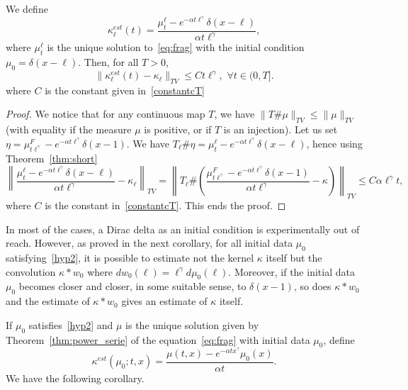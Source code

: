 \documentclass[10pt]{amsart}
\theoremstyle{definition}\newtheorem{defi}[theo]{Definition}\newtheorem{rema}[theo]{Remark}\newtheorem{exam}[theo]{Example}\newtheorem{exem}[theo]{Example}\newtheorem{nota}[theo]{Notation}
\renewcommand*\a{\alpha}
\let\oldforall\forall
\renewcommand*{\forall}{\mathrel{\oldforall}}
\begin{document}
\begin{coro}[An estimate for $\kappa$ using short-time measurements of the particles size distribution when initial condition is a delta function at $x=\ell$]\label{cor:rescaling}
We define
\begin{equation*}
\kappa_{\ell}^{est}(t)= \dfrac{\mu_t^{\ell} - e^{-\a t\ell^{\gamma}} \delta(x-\ell) }{\a t \ell^{\gamma}},
\end{equation*}
where $\mu_t^{\ell}$ is the unique solution to~\eqref{eq:frag} with the initial condition $\mu_0 = \delta(x-\ell)$. Then, for all $T>0$,
\begin{equation*}
\Big\| \kappa_{\ell}^{est}(t)-\kappa_{\ell}\Big\|_{TV} \leq C t \ell^{\gamma},\,\,\forall t\in (0, T].
\end{equation*}
where $C$ is the constant given in~\eqref{constantcT}
\end{coro}

\begin{proof}
We notice that for any continuous map $T$, we have $\|T\# \mu\|_{TV} \leq \|\mu\|_{TV} $ (with equality if the measure $\mu$ is positive, or if $T$ is an injection). Let us set $\eta= \mu_{t\ell^{\gamma}}^{F} - e^{-\a t\ell^{\gamma}} \delta(x-1) $. We have $T_{\ell} \#\eta=\mu_t^{\ell}-e^{-\a t\ell^{\gamma}} \delta(x-\ell) $, hence using Theorem~\ref{thm:short}
\begin{equation*}
\left\|\dfrac{\mu_t^{\ell} - e^{-\a t\ell^{\gamma}} \delta(x-\ell) }{\a t \ell^{\gamma}}-\kappa_{\ell}\right\|_{TV} = \left\| T_{\ell} \# \left(\dfrac{\mu_{t\ell^{\gamma}}^{F} - e^{-\a t\ell^{\gamma}} \delta(x-1) }{\a t \ell^{\gamma}}-\kappa\right)\right\|_{TV} \leq C \a \ell^{\gamma} t,
\end{equation*}
where $C$ is the constant in~\eqref{constantcT}. This ends the proof.
\end{proof}

In most of the cases, a Dirac delta as an initial condition is experimentally out of reach. However, as proved in the next corollary, for all initial data $\mu _0$ satisfying~\eqref{hyp2}, it is possible to estimate not the kernel $\kappa$ itself but the convolution $\kappa \ast w _0$ where $dw_0(\ell)=\ell^\gamma d\mu _0(\ell)$. Moreover, if the initial data $\mu _0$ becomes closer and closer, in some suitable sense, to $\delta (x-1)$, so does $\kappa \ast w _0$ and the estimate of $\kappa \ast w_0$ gives an estimate of $\kappa $ itself.

If $\mu _0$ satisfies~\eqref{hyp2} and $\mu $ is the unique solution given by Theorem~\ref{thm:power_serie} of the equation~\eqref{eq:frag} with initial data $\mu _0$, define
\begin{equation}\label{def:kappaestmu0}
\kappa^{est}(\mu _0; t, x)=\dfrac{\mu (t,x) - e^{-\a tx^{\gamma}}\mu _0(x)}{\a t}.
\end{equation}
We have the following corollary.
\end{document}
